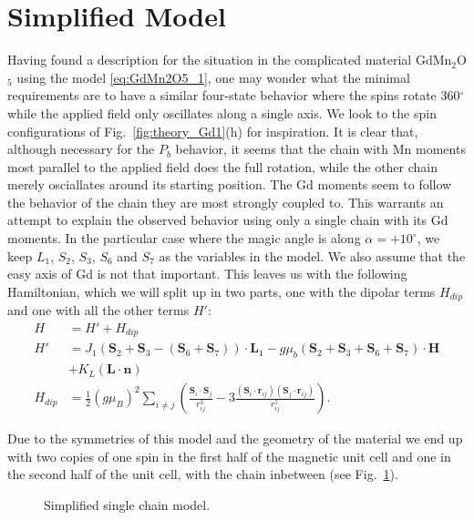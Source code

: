 \section{Simplified Model}
Having found a description for the situation in the complicated material GdMn$_2$O$_5$ using the model \ref{eq:GdMn2O5_1}, one may wonder what the minimal requirements are to have a similar four-state behavior where the spins rotate 360$^\circ$ while the applied field only oscillates along a single axis.
We look to the spin configurations of Fig.~\ref{fig:theory_Gd1}(h) for inspiration. It is clear that, although necessary for the $P_b$ behavior, it seems that the chain with Mn moments most parallel to the applied field does the full rotation, while the other chain merely osciallates around its starting position. The Gd moments seem to follow the behavior of the chain they are most strongly coupled to. This warrants an attempt to explain the observed behavior using only a single chain with its Gd moments.   
In the particular case where the magic angle is along $\alpha = +10^\circ$, we keep $L_1$, $S_2$, $S_3$, $S_6$ and $S_7$ as the variables in the model. We also assume that the easy axis of Gd is not that important.
This leaves us with the following Hamiltonian, which we will split up in two parts, one with the dipolar terms $H_{dip}$ and one with all the other terms $H'$:
\begin{align}
	H &= H' + H_{dip} \\
	H' &= J_1(\mathbf{S}_2 + \mathbf{S}_3 - (\mathbf{S}_6 + \mathbf{S}_7))\cdot\mathbf{L}_1 - g \mu_b (\mathbf{S}_2 + \mathbf{S}_3 + \mathbf{S}_6 + \mathbf{S}_7) \cdot \mathbf{H} \\
	&+ K_L (\mathbf{L} \cdot \mathbf{n}) \\
	H_{dip} &= \frac{1}{2}(g \mu_B)^2\sum_{i\neq j}\left(\frac{\mathbf{S}_i\cdot \mathbf{S}_j}{r_{ij}^3}-3\frac{(\mathbf{S}_i\cdot \mathbf{r}_{ij})(\mathbf{S}_j\cdot \mathbf{r}_{ij})}{r_{ij}^5}\right).
\end{align}

Due to the symmetries of this model and the geometry of the material we end up with two copies of one spin in the first half of the magnetic unit cell and one in the second half of the unit cell, with the chain inbetween (see Fig.~\ref{fig:GdMn2O5_simple_model}).
\begin{figure}
	\caption{\label{fig:GdMn2O5_simple_model} Simplified single chain model.}
\end{figure}

